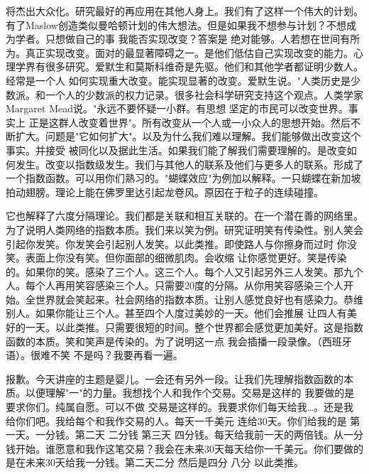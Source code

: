 将杰出大众化。研究最好的再应用在其他人身上。我们有了这样一个伟大的计划。有了Maslow创造类似曼哈顿计划的伟大想法。但是如果我不想参与计划？不想成为学者。只想做自己的事 我能否实现改变？答案是 绝对能够。人若想在世间有所为。真正实现改变。面对的最显著障碍之一。是他们低估自己实现改变的能力。心理学界有很多研究。爱默生和莫斯科维奇是先驱。他们和其他学者都证明少数人。经常是一个人 如何实现重大改变。能实现显著的改变。爱默生说。"人类历史是少数派。和一个人的少数派的权力记录。很多社会科学研究支持这个观点。人类学家Margaret Mead说。"永远不要怀疑一小群。有思想 坚定的市民可以改变世界。事实上 正是这群人改变着世界"。所有改变从一个人或一小众人的思想开始。然后不断扩大。问题是"它如何扩大"。以及为什么我们难以理解。我们能够做出改变这个事实。并接受 被同化以及据此生活。如果我们能了解我们需要理解的。是改变如何发生。改变以指数级发生。我们与其他人的联系及他们与更多人的联系。形成了一个指数函数。可以用你们熟习的。"蝴蝶效应"为例加以解释。一只蝴蝶在新加坡拍动翅膀。理论上能在佛罗里达引起龙卷风。原因在于粒子的连续碰撞。 

它也解释了六度分隔理论。我们都是关联和相互关联的。在一个潜在善的网络里。为了说明人类网络的指数本质。我们来以笑为例。研究证明笑有传染性。别人笑会引起你发笑。你发笑会引起别人发笑。以此类推。即使路人与你擦身而过时 你没笑。表面上你没有笑。但你面部的细微肌肉。会收缩 让你感觉更好。笑是传染的。如果你的笑。感染了三个人。这三个人。每个人又引起另外三人发笑。那九个人。每个人再用笑容感染三个人。只需要20度的分隔。从你用笑容感染三个人开始。全世界就会笑起来。社会网络的指数本质。让别人感觉良好也有感染力。恭维别人。如果你能让三个人。甚至四个人度过美妙的一天。他们会推展 让四人有美好的一天。以此类推。只需要很短的时间。整个世界都会感觉更加美好。这是指数函数的本质。笑和笑声是传染的。为了说明这一点 我会插播一段录像。（西班牙语）。很难不笑 不是吗？我要再看一遍。 

报歉。今天讲座的主题是婴儿。一会还有另外一段。让我们先理解指数函数的本质。以便理解"一"的力量。我想找个人和我作个交易。交易是这样的 我要做的是要求你们。纯属自愿。可以不做 交易是这样的。我要求你们每天给我…。还是我给你们吧。我给每个和我作交易的人。每天一千美元 连给30天。你们给我的是 第一天。一分钱。第二天 二分钱 第三天 四分钱。每天给我前一天的两倍钱。从一分钱开始。谁愿意和我作这笔交易？我会在未来30天每天给你一千美元。你们要做的是在未来30天给我一分钱。第二天二分 然后是四分 八分 以此类推。 

